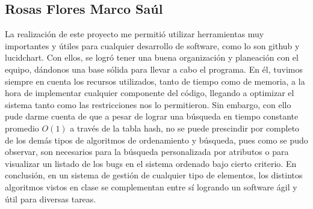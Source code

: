 \documentclass[12pt,letterpaper]{article}
\begin{document}
\subsection{Rosas Flores Marco Saúl}
La realización de este proyecto me permitió utilizar herramientas muy importantes y útiles para cualquier desarrollo de software, como lo son github y lucidchart. Con ellos, se logró tener una buena organización y planeación con el equipo, dándonos una base sólida para llevar a cabo el programa. En él, tuvimos siempre en cuenta los recursos utilizados, tanto de tiempo como de memoria, a la hora de implementar cualquier componente del código, llegando a optimizar el sistema tanto como las restricciones nos lo permitieron. Sin embargo, con ello pude darme cuenta de que a pesar de lograr una búsqueda en tiempo constante promedio $O(1)$ a través de la tabla hash, no se puede prescindir por completo de los demás tipos de algoritmos de ordenamiento y búsqueda, pues como se pudo observar, son necesarios para la búsqueda personalizada por atributos o para visualizar un listado de los bugs en el sistema ordenado bajo cierto criterio. En conclusión, en un sistema de gestión de cualquier tipo de elementos, los distintos algoritmos vistos en clase se complementan entre sí logrando un software ágil y útil para diversas tareas.
\end{document}
